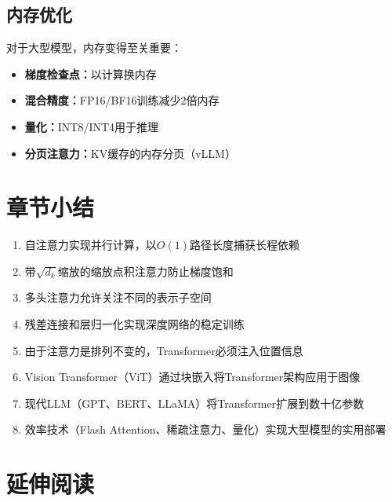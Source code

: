 \subsection{内存优化}

对于大型模型，内存变得至关重要：
\begin{itemize}
    \item \textbf{梯度检查点：}以计算换内存
    \item \textbf{混合精度：}FP16/BF16训练减少2倍内存
    \item \textbf{量化：}INT8/INT4用于推理
    \item \textbf{分页注意力：}KV缓存的内存分页（vLLM）
\end{itemize}

\section{章节小结}

\begin{enumerate}
    \item 自注意力实现并行计算，以$O(1)$路径长度捕获长程依赖
    \item 带$\sqrt{d_k}$缩放的缩放点积注意力防止梯度饱和
    \item 多头注意力允许关注不同的表示子空间
    \item 残差连接和层归一化实现深度网络的稳定训练
    \item 由于注意力是排列不变的，Transformer必须注入位置信息
    \item Vision Transformer（ViT）通过块嵌入将Transformer架构应用于图像
    \item 现代LLM（GPT、BERT、LLaMA）将Transformer扩展到数十亿参数
    \item 效率技术（Flash Attention、稀疏注意力、量化）实现大型模型的实用部署
\end{enumerate}

\section{延伸阅读}

